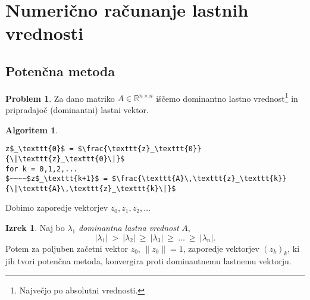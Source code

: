 \documentclass[11pt]{article}
\newcommand{\R}{\mathbb{R}}
\theoremstyle{definition}
\theoremstyle{definition}
\newtheorem{problem}{Problem}[section]
\newtheorem{izrek}{Izrek}[section]
\newtheorem*{algoritem}{Algoritem}
\begin{document}

\pagebreak


\section{Numerično računanje lastnih vrednosti}
\vspace{0.5cm}


\subsection{Potenčna metoda}
\vspace{0.5cm}

\begin{problem}

Za dano matriko $A \in \R^{n \times n}$ iščemo dominantno lastno \hbox{vrednost}\footnote{Največjo po absolutni vrednosti.} in pripradajoč (dominantni) lastni vektor.

\end{problem}
\vspace{0.5cm}

\begin{algoritem}
~
\begin{lstlisting}
z$_\texttt{0}$ = $\frac{\texttt{z}_\texttt{0}}{\|\texttt{z}_\texttt{0}\|}$
for k = 0,1,2,...
$~~~~$z$_\texttt{k+1}$ = $\frac{\texttt{A}\,\texttt{z}_\texttt{k}}{\|\texttt{A}\,\texttt{z}_\texttt{k}\|}$
\end{lstlisting}
Dobimo zaporedje vektorjev $z_0, z_1, z_2, \ldots$

\end{algoritem}
\vspace{0.5cm}

\begin{izrek}

Naj bo $\lambda_1$ \textit{dominantna lastna vrednost} $A$, 
$$|\lambda_1| ~>~ |\lambda_2| ~\geq~ |\lambda_3| ~\geq~ \ldots ~\geq~ |\lambda_n|.$$
Potem za poljuben začetni vektor $z_0$, $\|z_0\| = 1$, zaporedje vektorjev $(z_k)_k$, ki jih tvori potenčna metoda, konvergira proti dominantnemu lastnemu \hbox{vektorju}.

\end{izrek}
\vspace{0.5cm}
\end{document}
